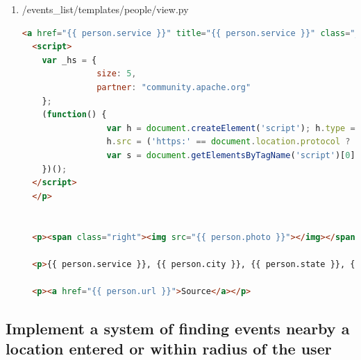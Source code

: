\documentclass[letterpaper,10pt,onecolumn]{IEEEtran} %
\begin{document}
\begin{enumerate}
\begin{center}
\begin{lstlisting}[language=Python]
    for member in members:
        try:
            person = Person.objects.get(meetupID = member['id'])
        except Person.DoesNotExist:
            person = Person()

        try:
            person.meetupID = member['id']
            person.name = member['name']
            #person.service = member['other_services']['twitter']['identifier']
            person.country = member['country']
            if 'other_services' in member.keys():
                if 'twitter' in member['other_services'].keys():
                    if 'identifier' in member['other_services']['twitter'].keys():
                        person.service = member['other_services']['twitter']['identifier']

\end{lstlisting}
\end{center}

\item /events\_list/templates/people/view.py
\begin{center}
\begin{lstlisting}[language=HTML]
<a href="{{ person.service }}" title="{{ person.service }}" class="_hs_socialshare" > Tweet at this Person </a>
  <script>
    var _hs = {
               size: 5,
               partner: "community.apache.org"
    };
    (function() {
                 var h = document.createElement('script'); h.type = 'text/javascript'; h.async = true;
                 h.src = ('https:' == document.location.protocol ? 'https://' : 'http://') + 'dtirydke3kdq7.cloudfront.net/hootlet.js?v=1';
                 var s = document.getElementsByTagName('script')[0]; s.parentNode.insertBefore(h, s);
    })();
  </script>
  </p>


  <p><span class="right"><img src="{{ person.photo }}"></img></span> {{ person.bio }}</p>

  <p>{{ person.service }}, {{ person.city }}, {{ person.state }}, {{ person.country }} ({{ person.latitude }}, {{ person.longitude }})</p>

  <p><a href="{{ person.url }}">Source</a></p>


\end{lstlisting}
\end{center}

\end{enumerate}

\subsection{Implement a system of finding events nearby a location entered or within radius of the user}
\end{document}
